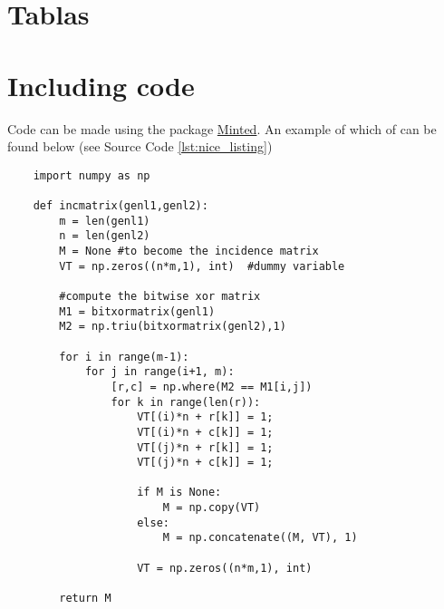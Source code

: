 \section*{Tablas}

\tinylipsum


\tinylipsum

\section*{Including code}

Code can be made using the package
\href{https://www.sharelatex.com/learn/Code\_Highlighting\_with\_minted}{Minted}.
An example of which of can be found below (see Source Code \ref{lst:nice_listing})

\begin{code} %

	\begin{verbatim}
	import numpy as np

	def incmatrix(genl1,genl2):
	    m = len(genl1)
	    n = len(genl2)
	    M = None #to become the incidence matrix
	    VT = np.zeros((n*m,1), int)  #dummy variable

	    #compute the bitwise xor matrix
	    M1 = bitxormatrix(genl1)
	    M2 = np.triu(bitxormatrix(genl2),1)

	    for i in range(m-1):
	        for j in range(i+1, m):
	            [r,c] = np.where(M2 == M1[i,j])
	            for k in range(len(r)):
	                VT[(i)*n + r[k]] = 1;
	                VT[(i)*n + c[k]] = 1;
	                VT[(j)*n + r[k]] = 1;
	                VT[(j)*n + c[k]] = 1;

	                if M is None:
	                    M = np.copy(VT)
	                else:
	                    M = np.concatenate((M, VT), 1)

	                VT = np.zeros((n*m,1), int)

	    return M
	\end{verbatim}
  \label{lst:nice_listing}
\end{code}

